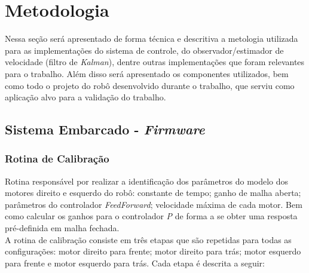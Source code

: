 \chapter[Metodologia]{Metodologia}
\label{ch:metodologia}

Nessa seção será apresentado de forma técnica e descritiva a metologia utilizada para as implementações do sistema de controle, do observador/estimador de velocidade (filtro de \emph{Kalman}), dentre outras implementações que foram relevantes para o trabalho. Além disso será apresentado os componentes utilizados, bem como todo o projeto do robô desenvolvido durante o trabalho, que serviu como aplicação alvo para a validação do trabalho.



\section{Sistema Embarcado - \emph{Firmware}}
\label{sec:sistema_embarcado}



\subsection{Rotina de Calibração}
\label{subsec:rotina_calibracao}

Rotina responsável por realizar a identificação dos parâmetros do modelo dos motores direito e esquerdo do robô: constante de tempo; ganho de malha aberta; parâmetros do controlador \emph{FeedForward}; velocidade máxima de cada motor. Bem como calcular os ganhos para o controlador \emph{P} de forma a se obter uma resposta pré-definida em malha fechada.\\

A rotina de calibração consiste em três etapas que são repetidas para todas as configurações: motor direito para frente; motor direito para trás; motor esquerdo para frente e motor esquerdo para trás. Cada etapa é descrita a seguir: \\


